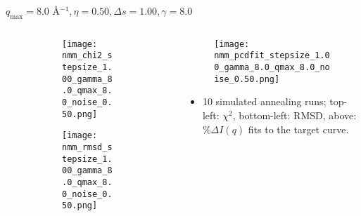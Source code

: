 \documentclass{beamer}
\begin{document}
\begin{frame}{$ q_{\textrm{max}}=8.0 $ \AA $^{-1}, \eta=0.50, \Delta s=1.00, \gamma=8.0$}
	\begin{columns}
		\begin{column}{.5\textwidth}
			\begin{figure}[H]
			\centering
			\begin{subfigure}[b]{\textwidth}
				\centering
				\texttt{[image: nmm\_chi2\_stepsize\_1.00\_gamma\_8.0\_qmax\_8.0\_noise\_0.50.png]}
				\label{fig:}
			\end{subfigure}
			\begin{subfigure}[b]{\textwidth}
				\centering
				\texttt{[image: nmm\_rmsd\_stepsize\_1.00\_gamma\_8.0\_qmax\_8.0\_noise\_0.50.png]}
				\label{fig:}
			\end{subfigure}
			\end{figure}
		\end{column}
		\begin{column}{.5\textwidth}
			\begin{figure}[H]
				\centering
				\texttt{[image: nmm\_pcdfit\_stepsize\_1.00\_gamma\_8.0\_qmax\_8.0\_noise\_0.50.png]}
				\label{fig:}
			\end{figure}
			\begin{itemize}
				\item 10 simulated annealing runs; top-left: $\chi^2$, bottom-left: RMSD, above: $\%\Delta I(q)$ fits to the target curve.
			\end{itemize}
		\end{column}
	\end{columns}
\end{frame}
 
\end{document}
